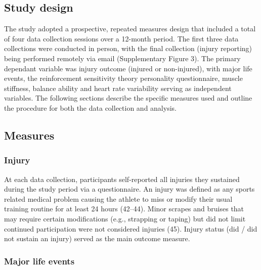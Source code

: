 \documentclass[
  english,
  man]{apa6}
\begin{document}
\hypertarget{study-design}{%
\subsection{Study design}\label{study-design}}

The study adopted a prospective, repeated measures design that included a total of four data collection sessions over a 12-month period.
The first three data collections were conducted in person, with the final collection (injury reporting) being performed remotely via email (Supplementary Figure 3).
The primary dependant variable was injury outcome (injured or non-injured), with major life events, the reinforcement sensitivity theory personality questionnaire, muscle stiffness, balance ability and heart rate variability serving as independent variables.
The following sections describe the specific measures used and outline the procedure for both the data collection and analysis.

\hypertarget{measures}{%
\subsection{Measures}\label{measures}}

\hypertarget{injury}{%
\subsubsection{Injury}\label{injury}}

At each data collection, participants self-reported all injuries they sustained during the study period via a questionnaire.
An injury was defined as any sports related medical problem causing the athlete to miss or modify their usual training routine for at least 24 hours (42--44).
Minor scrapes and bruises that may require certain modifications (e.g., strapping or taping) but did not limit continued participation were not considered injuries (45).
Injury status (did / did not sustain an injury) served as the main outcome measure.

\hypertarget{major-life-events}{%
\subsubsection{Major life events}\label{major-life-events}}
\end{document}
